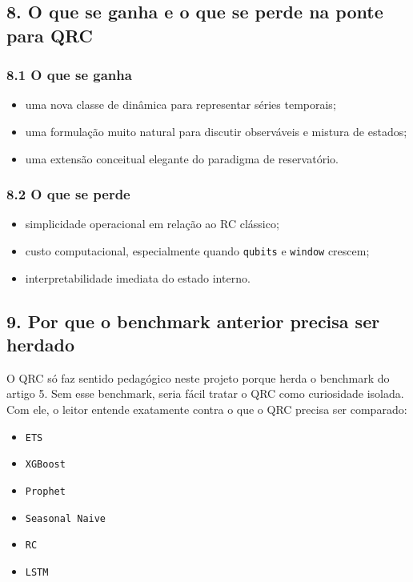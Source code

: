 \documentclass[12pt]{article}
\providecommand{\tightlist}{%
          \setlength{\itemsep}{0pt}\setlength{\parskip}{0pt}}
\begin{document}
\subsection{8. O que se ganha e o que se perde na ponte para QRC}\label{8-o-que-se-ganha-e-o-que-se-perde-na-ponte-para-qrc}

\subsubsection{8.1 O que se ganha}\label{81-o-que-se-ganha}

\begin{itemize}
\tightlist
\item
  uma nova classe de dinâmica para representar séries temporais;
\item
  uma formulação muito natural para discutir observáveis e mistura de estados;
\item
  uma extensão conceitual elegante do paradigma de reservatório.
\end{itemize}

\subsubsection{8.2 O que se perde}\label{82-o-que-se-perde}

\begin{itemize}
\tightlist
\item
  simplicidade operacional em relação ao RC clássico;
\item
  custo computacional, especialmente quando \texttt{qubits} e \texttt{window} crescem;
\item
  interpretabilidade imediata do estado interno.
\end{itemize}

\subsection{9. Por que o benchmark anterior precisa ser herdado}\label{9-por-que-o-benchmark-anterior-precisa-ser-herdado}

O QRC só faz sentido pedagógico neste projeto porque herda o benchmark do artigo 5. Sem esse benchmark, seria fácil tratar o QRC como curiosidade isolada. Com ele, o leitor entende exatamente contra o que o QRC precisa ser comparado:

\begin{itemize}
\tightlist
\item
  \texttt{ETS}
\item
  \texttt{XGBoost}
\item
  \texttt{Prophet}
\item
  \texttt{Seasonal\ Naive}
\item
  \texttt{RC}
\item
  \texttt{LSTM}
\end{itemize}
\end{document}
